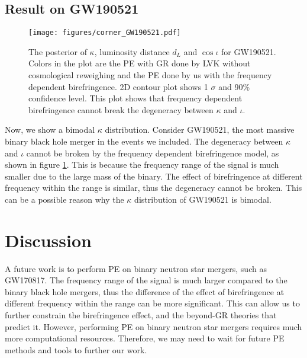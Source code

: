 \documentclass[reprint,amsmath,amssymb,aps,twocolumn]{aastex631}
\begin{document}
\subsection{Result on GW190521}
\begin{figure}[h]
    \texttt{[image: figures/corner\_GW190521.pdf]}
    \caption{
        The posterior of $\kappa$, luminosity distance $d_L$ and $\cos{\iota}$ for GW190521.
        Colors in the plot are the PE with GR done by LVK without cosmological reweighing \citep{GWTC-2.1, GWTC-3} and the PE done by us with the frequency dependent birefringence.
        2D contour plot shows 1 $\sigma$ and 90\% confidence level.
        This plot shows that frequency dependent birefringence cannot break the degeneracy between $\kappa$ and $\iota$.
    }
    \label{fig:corner_GW190521}
\end{figure}

Now, we show a bimodal $\kappa$ distribution.
Consider GW190521, the most massive binary black hole merger in the events we included.
The degeneracy between $\kappa$ and $\iota$ cannot be broken by the frequency dependent birefringence model, as shown in figure \ref{fig:corner_GW190521}.
This is because the frequency range of the signal is much smaller due to the large mass of the binary.
The effect of birefringence at different frequency within the range is similar, thus the degeneracy cannot be broken.
This can be a possible reason why the $\kappa$ distribution of GW190521 is bimodal.

\section{Discussion}
\label{sec:Discussion}



A future work is to perform PE on binary neutron star mergers, such as GW170817.
The frequency range of the signal is much larger compared to the binary black hole mergers, thus the difference of the effect of birefringence at different frequency within the range can be more significant.
This can allow us to further constrain the birefringence effect, and the beyond-GR theories that predict it.
However, performing PE on binary neutron star mergers requires much more computational resources.
Therefore, we may need to wait for future PE methods and tools to further our work.
\end{document}
